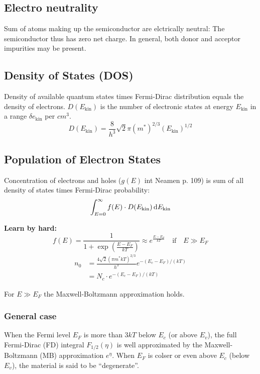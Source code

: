 \documentclass[a4paper, fontsize=8pt, landscape, DIV=1]{scrartcl}
\begin{document}
\begin{multicols*}{4}
  \subsection{Electro neutrality}
  Sum of atoms making up the semiconductor are elctrically neutral: The semiconductor thus has zero net charge.
  In general, both donor and acceptor impurities may be present.


  \subsection{Density of States (DOS)}
  Density of available quantum states times Fermi-Dirac distribution equals the density of electrons. $D(E_\text{kin})$ is the number of electronic states at energy $E_\text{kin}$ in a range $\delta e_\text{kin}$ per $cm^3$.
  \[D(E_\text{kin}) = \frac{8}{h^3}\sqrt{2}\pi(m^*)^{2/3}(E_\text{kin})^{1/2}\]

  \subsection{Population of Electron States}
  Concentration of electrons and holes ($g(E)$ int Neamen p. 109) is sum of all density of states times Fermi-Dirac probability:
  \[\int_{E=0}^\infty f(E) \cdot D(E_\text{kin})\,\mathrm{d} E_\text{kin}\]

  \textbf{Learn by hard:}
  \[f(E) = \frac{1}{1+\exp\left(\frac{E-E_F}{kT}\right)} \approx e^{\frac{E-E_F}{kT}} \quad\text{if} \quad E \gg E_F\]
  \begin{align*}
    n_0 &= \frac{4\sqrt{2}(\pi m^* kT)^{2/3}}{h^3}e^{-(E_c-E_F)/(kT)} \\
        &= N_c \cdot e^{-(E_c-E_F)/(kT)}
  \end{align*}

  For $E \gg E_F$ the Maxwell-Boltzmann approximation holds.

  \subsubsection{General case}
  When the Fermi level $E_F$ is more than $3kT$ below $E_c$ (or above $E_v$), the full Fermi-Dirac (FD) integral $F_{1/2}(\eta)$ is well approximated by the Maxwell-Boltzmann (MB) approximation $e^\eta$.
  When $E_F$ is colser or even above $E_c$ (below $E_v$), the material is said to be ``degenerate''.


\end{multicols*}
\end{document}

